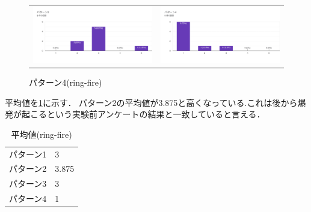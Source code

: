 \begin{figure}[h]
\begin{tabular}{cc}
      \begin{minipage}[t]{0.45\hsize}
        \centering
        \includegraphics[keepaspectratio, scale=0.5]{fig/ringfire3.png}
        \caption{パターン3(ring-fire)}
        \label{ring3}
      \end{minipage} &
      \begin{minipage}[t]{0.45\hsize}
        \centering
        \includegraphics[keepaspectratio, scale=0.5]{fig/ringfire4.png}
        \caption{パターン4(ring-fire)}
        \label{ring4}
      \end{minipage} 
    \end{tabular}
  \end{figure}

平均値を\ref{tab;ringAve}に示す．
パターン2の平均値が3.875と高くなっている.これは後から爆発が起こるという実験前アンケートの結果と一致していると言える．

\begin{table}[H]
    \caption{\label{tab;ringAve}平均値(ring-fire)}
    \centering
    \begin{tabular}{l|l}
    \hline
    \hline
    パターン1 & 3\\
    パターン2 & 3.875\\
    パターン3 & 3\\
    パターン4 & 1\\
    \hline
    \end{tabular}
\end{table}

